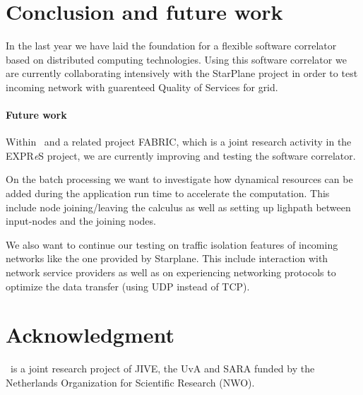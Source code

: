 \section{Conclusion and future work}
In the last year we have laid the foundation for a flexible software
correlator based on distributed computing technologies. Using this
software correlator we are currently collaborating intensively with
the StarPlane project in order to test incoming network with
guarenteed Quality of Services for grid.

\paragraph{Future work}
Within \scarie\ and a related project FABRIC, which is a joint
research activity in the EXPR{\it e}S project, we are currently
improving and testing the software correlator.

On the batch processing we want to investigate how dynamical resources
can be added during the application run time to accelerate the
computation. This include node joining/leaving the calculus as well as
setting up lighpath between input-nodes and the joining nodes.

We also want to continue our testing on traffic isolation features of
incoming networks like the one provided by Starplane. This include
interaction with network service providers as well as on experiencing
networking protocols to optimize the data transfer (using UDP instead
of TCP).

\section{Acknowledgment}
\scarie\ is a joint research project of JIVE, the UvA and SARA funded
by the Netherlands Organization for Scientific Research (NWO).


